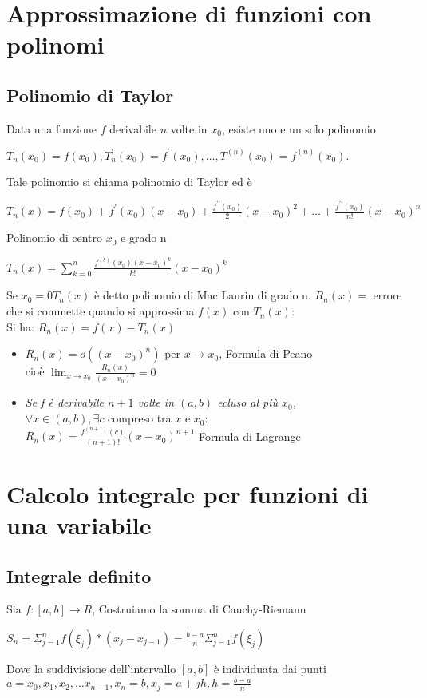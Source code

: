 \documentclass{book}
\begin{document}
\section{Approssimazione di funzioni con polinomi}
\subsection{Polinomio di Taylor}
Data una funzione $f$ derivabile $n$ volte in $x_0$, esiste uno e un solo
polinomio 
\begin{center}
	$T_n(x_0)=f(x_0),T^\prime_n(x_0)=f^\prime(x_0),\dots, T^{(n)}(x_0)=
f^{(n)}(x_0).$
\end{center}
Tale polinomio si chiama polinomio di Taylor ed è
\begin{center}
	$T_n(x)=f(x_0)+f^\prime(x_0)(x-x_0)+\frac{f^{\prime\prime}(x_0)}{2}(x-x_0)^2+\dots
	+ \frac{f^{\prime\prime}(x_0)}{n!}(x-x_0)^n$
\end{center}
Polinomio di centro $x_0$ e grado n
\begin{center}
	$T_n(x)=\sum^n_{k=0}\frac{f^{(b)}(x_0)(x-x_0)^k}{k!}(x-x_0)^k$
\end{center}
Se $x_0=0T_n(x)$ è detto polinomio di Mac Laurin di grado n. $R_n(x)=$ errore
che si commette quando si approssima $f(x)$ con $T_n(x)$:\\
Si ha: $R_n(x)=f(x)-T_n(x)$
\begin{itemize}
	\item $R_n(x)=o((x-x_0)^n)$ per $x\to x_0$, \underline{Formula di Peano}\\
		cioè $\lim_{x\to x_0}\frac{R_n(x)}{(x-x_0)^n}=0$
	\item \textit{Se f è derivabile $n+1$ volte in $(a,b)$ ecluso al più
		$x_0$,}\\
		$\forall x\in(a,b), \exists c$ compreso tra $x$ e $x_0$:\\
		$R_n(x)=\frac{f^{(n+1)}(c)}{(n+1)!}(x-x_0)^{n+1}$ Formula di Lagrange
\end{itemize}
\section{Calcolo integrale per funzioni di una variabile}
\subsection{Integrale definito}
Sia $f:[a,b]\to R$, 
Costruiamo la somma di Cauchy-Riemann
\begin{center}
	$S_n=\Sigma^n_{j=1}f(\xi_j)*(x_j-x_{j-1})=\frac{b-a}{n}\Sigma^{n}_{j=1}f(\xi_j)$
\end{center}
Dove la suddivisione dell'intervallo $[a,b]$ è individuata dai punti $a=x_0,x_1,x_2,\dots x_{n-1},x_n=b, x_j=a+jh, h=\frac{b-a}{n}$
\end{document}
